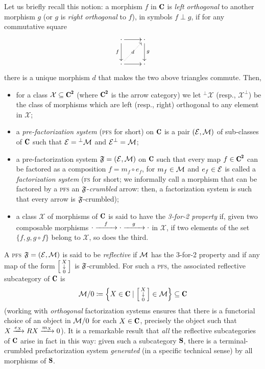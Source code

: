 Let us briefly recall this notion: a morphism $f$ in $\C$ is \emph{left orthogonal} to another morphism $g$ (or $g$ is \emph{right orthogonal} to $f$), in symbols $f\perp g$, if for any commutative square
\[
\xymatrix{
\cdot\ar[r]\ar[d]_f&\cdot\ar[d]^g\\
\cdot\ar[r]\ar@{.>}[ur]|{\ d\ }&\cdot
}
\]
there is a unique morphism $d$ that makes the two above triangles commute. Then,
\begin{itemize}%
\item for a class $\mathcal X\subseteq \C^\due$ (where $\C^\due$ is the arrow category) we let ${}^{\perp}\mathcal X$ (resp., $\mathcal X^{\perp}$) be the class of morphisms which are left (resp., right) orthogonal to any element in $\mathcal X$;
\item a \emph{pre-factorization system} (\textsc{pfs} for short) on $\C$ is a pair $(\mathcal{E},\mathcal{M})$ of sub-classes of $\C$ such that $\mathcal{E}={}^{\perp}\mathcal{M}$ and $\mathcal{E}^{\perp}=\mathcal{M}$;  
\item a pre-factorization system $\mathfrak{F}=(\mathcal{E},\mathcal{M})$ on $\C$ such that every map $f\in \C^\due$ can be factored as a composition $f=m_f\circ e_f$, for $m_f\in \mathcal{M}$ and $e_f\in \mathcal{E}$ is called a \emph{factorization system} (\textsc{fs} for short; we informally call a morphism that can be factored by a \textsc{pfs} an $\mathfrak{F}$-\emph{crumbled} arrow: then, a factorization system is such that every arrow is $\mathfrak{F}$-crumbled);
\item a class $\mathcal X$ of morphisms of $\C$ is said to have the \emph{3-for-2 property} if, given two composable morphisms $\cdot\xrightarrow{\quad f\quad }\cdot\xrightarrow{\quad g\quad }\cdot$ in $\mathcal X$, if two elements of the set $\{f,g,g\circ f\}$ belong to $\mathcal X$, so does the third.
\end{itemize}
A \textsc{pfs} $\mathfrak{F}=(\mathcal{E},\mathcal{M})$ is said to be \emph{reflective} if $\mathcal{M}$ has the 3-for-2 property and if any map of the form $\left[ \begin{smallmatrix} X \\ \downarrow \\ 0 \end{smallmatrix}\right]$ is $\mathfrak{F}$-crumbled. For such a \textsc{pfs}, the associated reflective subcategory of $\C$ is
\[
\M/0 \coloneqq \left\{X\in \C \mid \var{X}{0}\in \M\right\}\subseteq \C
\]
(working with \emph{orthogonal} factorization systems ensures that there is a functorial choice of an object in $\mathcal{M}/0$ for each $X\in \C$, precisely the object such that $X \xrightarrow{e_X} RX \xrightarrow{m_X} 0$). It is a remarkable result that \emph{all} the reflective subcategories of $\C$ arise in fact in this way: given such a subcategory $\cate{S}$, there is a terminal\hyp{}crumbled prefactorization system \emph{generated} (in a specific technical sense) by all morphisms of $\cate{S}$.

